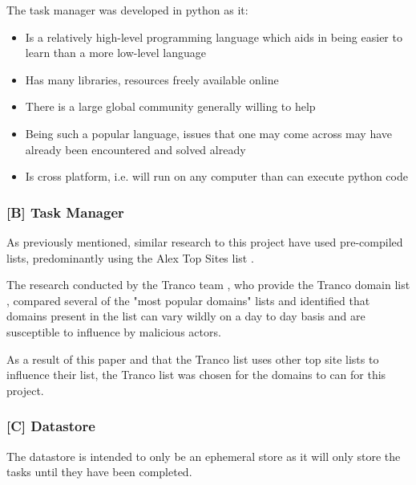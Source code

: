 \documentclass{mscreport}
\begin{document}
\noindent
The task manager was developed in python as it:

\begin{itemize}
	\setlength\itemsep{0.1em}
    \item Is a relatively high-level programming language which aids in being easier to learn than a more low-level language
    \item Has many libraries, resources freely available online
    \item There is a large global community generally willing to help
    \item Being such a popular language, issues that one may come across may have already been encountered and solved already
    \item Is cross platform, i.e. will run on any computer than can execute python code
\end{itemize}

\subsubsection{[B] Task Manager}

As previously mentioned, similar research to this project have used pre-compiled lists, predominantly using the Alex Top Sites list \cite{Buchanan2018-xz,Chen2016-dl,Kumar2017-qw,Patil2017-bg,Ying2016-ag,Michael2015-hn,Van_Goethem2014-ao,Holz2020-ha,Poteat2021-zr}.

\vspace{0.3cm} \noindent
The research conducted by the Tranco team \cite{Le_Pochat2018-ql}, who provide the Tranco domain list \cite{noauthor_undated-mt}, compared several of the "most popular domains" lists and identified that domains present in the list can vary wildly on a day to day basis and are susceptible to influence by malicious actors.

\vspace{0.3cm} \noindent
As a result of this paper and that the Tranco list uses other top site lists to influence their list, the Tranco list \cite{noauthor_undated-mt} was chosen for the domains to can for this project.

\subsubsection{[C] Datastore}

The datastore is intended to only be an ephemeral store as it will only store the tasks until they have been completed.
\end{document}
